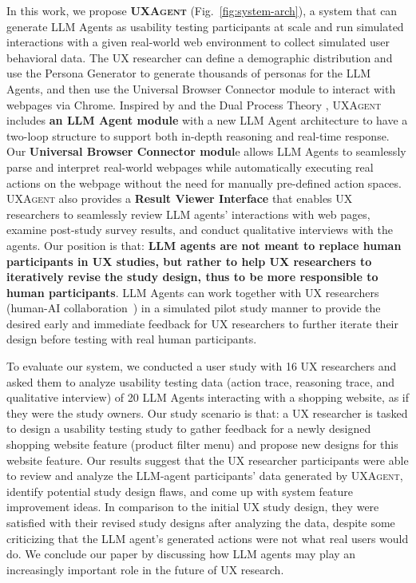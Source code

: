 \documentclass[manuscript,review,anonymous]{acmart}
\DeclareRobustCommand{\projectname}{\textsc{UXAgent}\xspace}
\begin{document}
In this work, we propose \textbf{\projectname} (Fig.~\ref{fig:system-arch}), a system that can generate LLM Agents as usability testing participants at scale and run simulated interactions with a given real-world web environment to collect simulated user behavioral data.
The UX researcher can define a demographic distribution and use the Persona Generator to generate thousands of personas for the LLM Agents, and then use the Universal Browser Connector module to interact with webpages via Chrome. 
Inspired by \citet{parkGenerativeAgentsInteractive2023} and the Dual Process Theory \cite{kahneman2011thinking,evansDualProcessTheoriesHigher2013,zhangLeveragingDualProcess2025,christakopoulouAgentsThinkingFast2024}, \projectname includes \textbf{an LLM Agent module }with a new LLM Agent architecture to have a two-loop structure to support both in-depth reasoning and real-time response.
Our \textbf{Universal Browser Connector modul}e allows LLM Agents to seamlessly parse and interpret real-world webpages while automatically executing real actions on the webpage without the need for manually pre-defined action spaces.
\projectname also provides a \textbf{Result Viewer Interface} that enables UX researchers to seamlessly review LLM agents’ interactions with web pages, examine post-study survey results, and conduct qualitative interviews with the agents.
Our position is that: \textbf{LLM agents are not meant to replace human participants in UX studies, but rather to help UX researchers to iteratively revise the study design, thus to be more responsible to human participants}.
LLM Agents can work together with UX researchers (human-AI collaboration~\cite{wangHumanAICollaborationData2019}) in a simulated pilot study manner to provide the desired early and immediate feedback for UX researchers to further iterate their design before testing with real human participants.


To evaluate our system, we conducted a user study with 16 UX researchers and asked them to analyze usability testing data (action trace, reasoning trace, and qualitative interview) of 20 LLM Agents interacting with a shopping website, as if they were the study owners.
Our study scenario is that: a UX researcher is tasked to design a usability testing study to gather feedback for a newly designed shopping website feature (product filter menu) and propose new designs for this website feature.
Our results suggest that the UX researcher participants were able to review and analyze the LLM-agent participants' data generated by \projectname, identify potential study design flaws, and come up with system feature improvement ideas. In comparison to the initial UX study design, they were satisfied with their revised study designs after analyzing the data, despite some criticizing that the LLM agent's generated actions were not what real users would do.
We conclude our paper by discussing how LLM agents may play an increasingly important role in the future of UX research.
\end{document}

